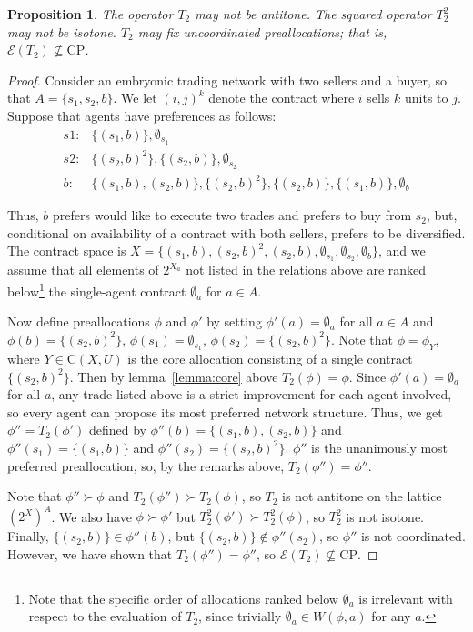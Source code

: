 \documentclass[11pt,reqno]{amsart}
\newtheorem{prop}[thm]{Proposition}
\theoremstyle{definition}
\numberwithin{equation}{section}
\newcommand{\prf}{\begin{proof}}
\newcommand{\eprf}{\end{proof}}
\newcommand{\pre}{\phi}
\newcommand{\coordpre}{\mathrm{CP}}
\newcommand{\prealloc}{(2^X)^A}
\newcommand{\sub}{\subseteq}
\newcommand{\core}{\mathrm{C}(X,U)}
\newcommand{\fix}{\mathcal{E}}
\newcommand{\su}{\succ}
\newcommand{\optwo}{T_2}
\begin{document}
\begin{prop} \label{prop:maxdom}
The operator $\optwo$ may not be antitone.
The squared operator $\optwo^2$ may not be isotone.
$\optwo$ may fix uncoordinated preallocations; that is, $\fix(\optwo) \not \sub \coordpre$.
\end{prop}
\prf 
Consider an embryonic trading network with two sellers and a buyer, so that $A = \{s_1,s_2,b\}$. 
We let $(i,j)^k$ denote the contract where $i$ sells $k$ units to $j$.
Suppose that agents have preferences as follows:
\begin{align*}
s1:& \{(s_1,b)\}, \emptyset_{s_1} \\
s2:& \{(s_2,b)^2\}, \{(s_2,b)\}, \emptyset_{s_2} \\
b:& \{(s_1,b), (s_2,b) \}, \{(s_2,b)^2\}, \{(s_2,b)\}, \{(s_1,b)\}, \emptyset_b
\end{align*}

Thus, $b$ prefers would like to execute two trades and prefers to buy from $s_2$, but, conditional on availability of a contract with both sellers, prefers to be diversified.
The contract space is $X = \{(s_1,b), (s_2,b)^2, (s_2,b), \emptyset_{s_1}, \emptyset_{s_2}, \emptyset_b\}$, and we assume that all elements of $2^{X_a}$ not listed in the relations above are ranked below\footnote{Note that the specific order of allocations ranked below $\emptyset_a$ is irrelevant with respect to the evaluation of $\optwo$, since trivially $\emptyset_a \in W(\pre,a)$ for any $a$.} the single-agent contract $\emptyset_a$ for $a \in A$.

Now define preallocations $\pre$ and $\pre'$ by setting $\pre'(a) = \emptyset_a$ for all $a \in A$ and $\pre(b) = \{(s_2,b)^2\}$, $\pre(s_1) = \emptyset_{s_1}$, $\pre(s_2) = \{(s_2,b)^2\}$.
Note that $\pre = \pre_Y$, where $Y \in \core$ is the core allocation consisting of a single contract $\{(s_2,b)^2\}$. 
Then by lemma~\ref{lemma:core} above $\optwo(\pre) = \pre$.
Since $\pre'(a) = \emptyset_a$ for all $a$, any trade listed above is a strict improvement for each agent involved, so every agent can propose its most preferred network structure.
Thus, we get $\pre'' = \optwo(\pre')$ defined by $\pre''(b) = \{(s_1,b),(s_2,b)\}$ and $\pre''(s_1) = \{(s_1,b)\}$ and $\pre''(s_2) = \{(s_2,b)^2\}$.
$\pre''$ is the unanimously most preferred preallocation, so, by the remarks above, $\optwo(\pre'') = \pre''$.

Note that $\pre'' \su \pre$ and $\optwo(\pre'') \su \optwo(\pre)$, so $\optwo$ is not antitone on the lattice $\prealloc$.
We also have $\pre \su \pre'$ but $\optwo^2(\pre') \su \optwo^2(\pre)$, so $\optwo^2$ is not isotone.
Finally, $ \{(s_2,b)\} \in \pre''(b)$, but $\{(s_2,b)\} \not \in \pre''(s_2)$, so $\pre''$ is not coordinated.
However, we have shown that $\optwo(\pre'') = \pre''$, so $\fix(\optwo) \not \sub \coordpre$.
\eprf
\end{document}
